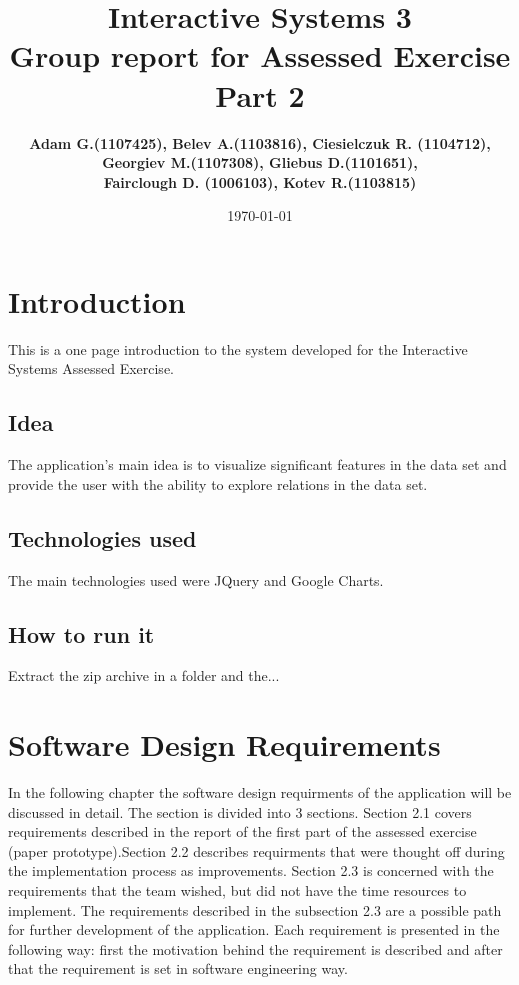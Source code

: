 \documentclass[a4paper]{article}
\title{Interactive Systems 3\\ \vspace{4mm} 
Group report for Assessed Exercise Part 2}
\author{\bf Adam G.(1107425), Belev A.(1103816), Ciesielczuk R. (1104712),\\ \bf Georgiev M.(1107308), Gliebus D.(1101651),\\ \bf Fairclough D. (1006103), Kotev R.(1103815)}
\date{\today}
\begin{document}
\maketitle
\newpage



\section{Introduction}
This is a one page introduction to the system developed for the Interactive Systems Assessed Exercise. 
\subsection{Idea}
The application's main idea is to visualize significant features in the data set and provide the user with the ability to explore relations in the data set.
\subsection{Technologies used} The main technologies used were JQuery and Google Charts.
\subsection{How to run it} Extract the zip archive in a folder and the...



\section{Software Design Requirements}
In the following chapter the software design requirments of the application will be discussed in detail. The section is divided into 3 sections. Section 2.1 covers requirements described in the report of the first part of the assessed exercise (paper prototype).Section 2.2 describes requirments that were thought off during the implementation process as improvements. Section 2.3 is concerned with the requirements that the team wished, but did not have the time resources to implement. The requirements described in the subsection 2.3 are a possible path for further development of the application. Each requirement is presented in the following way: first the motivation behind the requirement is described and after that the requirement is set in software engineering way.\\
\end{document}
